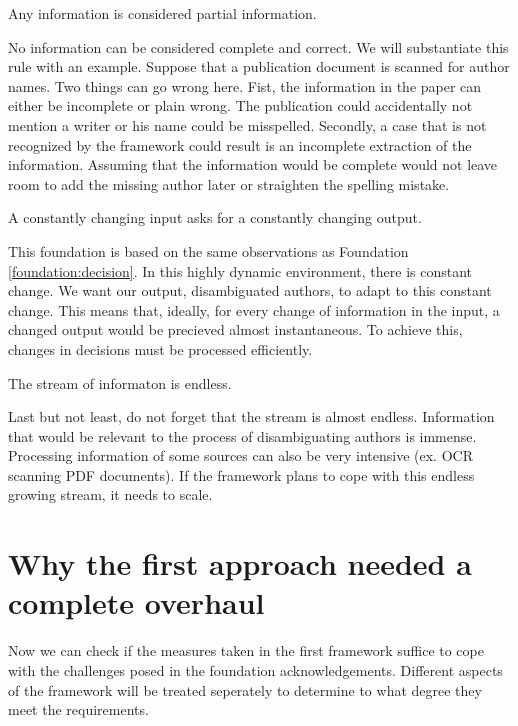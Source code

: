 \begin{foundation}
\label{foundation:partial}
Any information is considered partial information.
\end{foundation}

No information can be considered complete and correct. We will substantiate this rule with an example. Suppose that a publication document is scanned for author names. Two things can go wrong here. Fist, the information in the paper can either be incomplete or plain wrong. The publication could accidentally not mention a writer or his name could be misspelled. Secondly, a case that is not recognized by the framework could result is an incomplete extraction of the information. Assuming that the information would be complete would not leave room to add the missing author later or straighten the spelling mistake.

\begin{foundation}
\label{foundation:incremental}
A constantly changing input asks for a constantly changing output.
\end{foundation}

This foundation is based on the same observations as Foundation \autoref{foundation:decision}. In this highly dynamic environment, there is constant change. We want our output, disambiguated authors, to adapt to this constant change. This means that, ideally, for every change of information in the input, a changed output would be precieved almost instantaneous. To achieve this, changes in decisions must be processed efficiently.

\begin{foundation}
\label{foundation:endless}
The stream of informaton is endless.
\end{foundation}

Last but not least, do not forget that the stream is almost endless. Information that would be relevant to the process of disambiguating authors is immense. Processing information of some sources can also be very intensive (ex. OCR scanning PDF documents). If the framework plans to cope with this endless growing stream, it needs to scale.

\section{Why the first approach needed a complete overhaul}

Now we can check if the measures taken in the first framework suffice to cope with the challenges posed in the foundation acknowledgements. Different aspects of the framework will be treated seperately to determine to what degree they meet the requirements.


